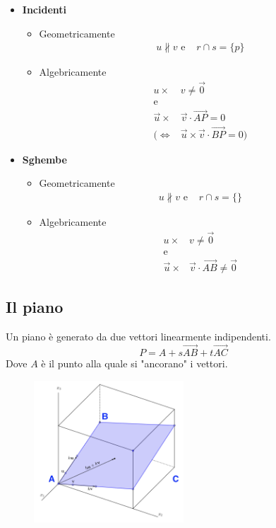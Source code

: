 \documentclass[../main.tex]{subfiles}
\begin{document}
\begin{itemize}
\begin{itemize}
    \end{itemize}
    \item \textbf{Incidenti}
    \begin{itemize}
        \item Geometricamente \begin{align*}
            u \nparallel v \text{ e }& r\cap s = \{ p\} 
        \end{align*} 
        \item Algebricamente \begin{align*}
            u \times& v \neq \vec{0} \\
            \text{e} \\
            \vec{u} \times& \vec{v} \cdot \vec{AP}  =  0 \\
            (\Leftrightarrow&  \vec{u} \times \vec{v} \cdot \vec{BP} = 0)
        \end{align*}
    \end{itemize}
    \item \textbf{Sghembe}
    \begin{itemize}
        \item Geometricamente \begin{align*}
            u \nparallel v \text{ e }& r\cap s = \{ \} 
        \end{align*} 
        \item Algebricamente \begin{align*}
            u \times& v \neq \vec{0} \\
            \text{e} \\
            \vec{u} \times& \vec{v} \cdot \vec{AB} \neq \vec{0}
        \end{align*}
    \end{itemize}
\end{itemize}

\pagebreak
\subsection{Il piano}
Un piano è generato da due vettori linearmente indipendenti.
$$
    P = A + s\vec{AB} + t\vec{AC}
$$
Dove $A$ è il punto alla quale si "ancorano" i vettori.
\begin{figure}[h]
    \centering
    \includegraphics[width=0.5\textwidth]{../images/piano.png}
\end{figure}
\end{document}
